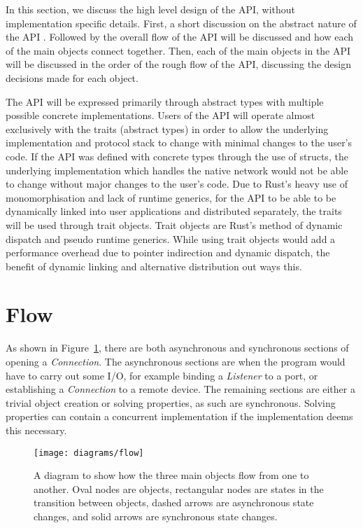 In this section, we discuss the high level design of the API, without implementation specific details.
First, a short discussion on the abstract nature of the API .
Followed by the overall flow of the API will be discussed and how each of the main objects connect together.
Then, each of the main objects in the API will be discussed in the order of the rough flow of the API, discussing
the design decisions made for each object.

The API will be expressed primarily through abstract types with multiple possible concrete implementations.
Users of the API will operate almost exclusively with the traits (abstract types) in order to allow the underlying
implementation and protocol stack to change with minimal changes to the user's code.
If the API was defined with concrete types through the use of structs, the underlying implementation which handles
the native network would not be able to change without major changes to the user's code.
Due to Rust's heavy use of monomorphisation and lack of runtime generics, for the API to be able to be dynamically
linked into user applications and distributed separately, the traits will be used through trait objects.
Trait objects are Rust's method of dynamic dispatch and pseudo runtime generics.
While using trait objects would add a performance overhead due to pointer indirection and dynamic dispatch, the benefit
of dynamic linking and alternative distribution out ways this.

\section{Flow}\label{sec:flow}
As shown in Figure~\ref{fig:flow}, there are both asynchronous and synchronous sections of opening a \emph{Connection}.
The asynchronous sections are when the program would have to carry out some I/O, for example binding a \emph{Listener}
to a port, or establishing a \emph{Connection} to a remote device.
The remaining sections are either a trivial object creation or solving properties, as such are synchronous.
Solving properties can contain a concurrent implementation if the implementation deems this necessary.

\begin{figure}[h]
\centering
\texttt{[image: diagrams/flow]}
\caption{A diagram to show how the three main objects flow from one to another.
Oval nodes are objects, rectangular nodes are states in the transition between objects, dashed arrows are
asynchronous state changes, and solid arrows are synchronous state changes.}
\label{fig:flow}
\end{figure}

